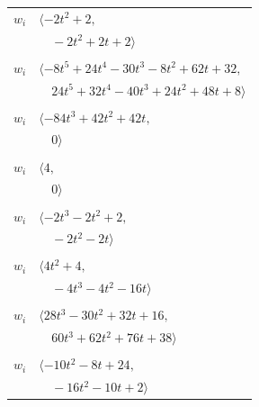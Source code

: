 \documentclass[11pt]{article}
\begin{document}
\begin{longtable}{@{}ll@{}}
$w_i$ & $\langle -2t^{2}+2,$\\
 & $\quad -2t^{2}+2t+2\rangle$\\
\addlinespace[2pt]
\multicolumn{2}{@{}p{0.97\textwidth}@{}}{$i=20$, $D_i=26$, $\rho_{ij}$: $9{:}1, \allowbreak 10{:}2, \allowbreak 21{:}1$}\\
$w_i$ & $\langle -8t^{5}+24t^{4}-30t^{3}-8t^{2}+62t+32,$\\
 & $\quad 24t^{5}+32t^{4}-40t^{3}+24t^{2}+48t+8\rangle$\\
\addlinespace[2pt]
\multicolumn{2}{@{}p{0.97\textwidth}@{}}{$i=21$, $D_i=42$, $\rho_{ij}$: $6{:}2, \allowbreak 13{:}1, \allowbreak 17{:}1, \allowbreak 20{:}2, \allowbreak 25{:}1$}\\
$w_i$ & $\langle -84t^{3}+42t^{2}+42t,$\\
 & $\quad 0\rangle$\\
\addlinespace[2pt]
\multicolumn{2}{@{}p{0.97\textwidth}@{}}{$i=22$, $D_i=2$, $\rho_{ij}$: $9{:}2, \allowbreak 10{:}2, \allowbreak 11{:}2, \allowbreak 28{:}2$}\\
$w_i$ & $\langle 4,$\\
 & $\quad 0\rangle$\\
\addlinespace[2pt]
\multicolumn{2}{@{}p{0.97\textwidth}@{}}{$i=23$, $D_i=2$, $\rho_{ij}$: $1{:}2, \allowbreak 3{:}2, \allowbreak 4{:}2, \allowbreak 5{:}1, \allowbreak 26{:}1$}\\
$w_i$ & $\langle -2t^{3}-2t^{2}+2,$\\
 & $\quad -2t^{2}-2t\rangle$\\
\addlinespace[2pt]
\multicolumn{2}{@{}p{0.97\textwidth}@{}}{$i=24$, $D_i=6$, $\rho_{ij}$: $4{:}2, \allowbreak 18{:}1, \allowbreak 19{:}2, \allowbreak 26{:}1, \allowbreak 27{:}1$}\\
$w_i$ & $\langle 4t^{2}+4,$\\
 & $\quad -4t^{3}-4t^{2}-16t\rangle$\\
\addlinespace[2pt]
\multicolumn{2}{@{}p{0.97\textwidth}@{}}{$i=25$, $D_i=52$, $\rho_{ij}$: $10{:}1, \allowbreak 21{:}2$}\\
$w_i$ & $\langle 28t^{3}-30t^{2}+32t+16,$\\
 & $\quad 60t^{3}+62t^{2}+76t+38\rangle$\\
\addlinespace[2pt]
\multicolumn{2}{@{}p{0.97\textwidth}@{}}{$i=26$, $D_i=14$, $\rho_{ij}$: $18{:}2, \allowbreak 19{:}1, \allowbreak 23{:}2, \allowbreak 24{:}2, \allowbreak 28{:}2$}\\
$w_i$ & $\langle -10t^{2}-8t+24,$\\
 & $\quad -16t^{2}-10t+2\rangle$\\

\end{longtable}
\end{document}
